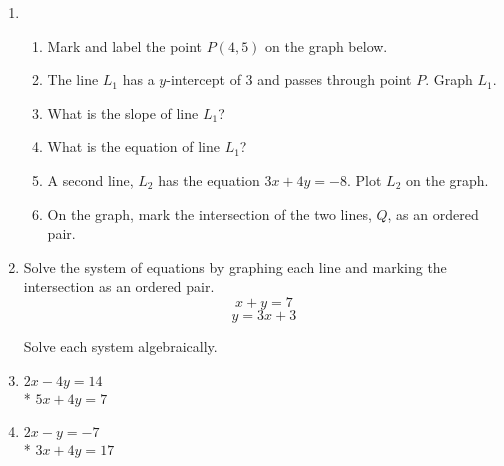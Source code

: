 \documentclass[12pt, oneside]{article}
\begin{document}
\begin{enumerate}
\item
  \begin{enumerate}
    \item Mark and label the point $P(4, 5)$ on the graph below.
    \item The line $L_1$ has a $y$-intercept of 3 and passes through point $P$. Graph $L_1$.
    \item What is the slope of line $L_1$? \vspace{2cm}
    \item What is the equation of line $L_1$? \vspace{2cm}
    \item A second line, $L_2$ has the equation $3x+4y=-8$. Plot $L_2$ on the graph.
    \item On the graph, mark the intersection of the two lines, $Q$, as an ordered pair.
  \end{enumerate}

  \begin{center} %
  \end{center}

\newpage
  \item Solve the system of equations by graphing each line and marking the intersection as an ordered pair.
    \[x+y=7\]
    \[y=3x+3\]

\begin{center} %
\end{center}

\newpage
  Solve each system algebraically.
  \item
  $2x-4y=14$\\*
  $5x+4y=7$ \vspace{6cm}

  \item
  $2x-y=-7$\\*
  $3x+4y=17$  \vspace{6cm}



\end{enumerate}
\end{document}
